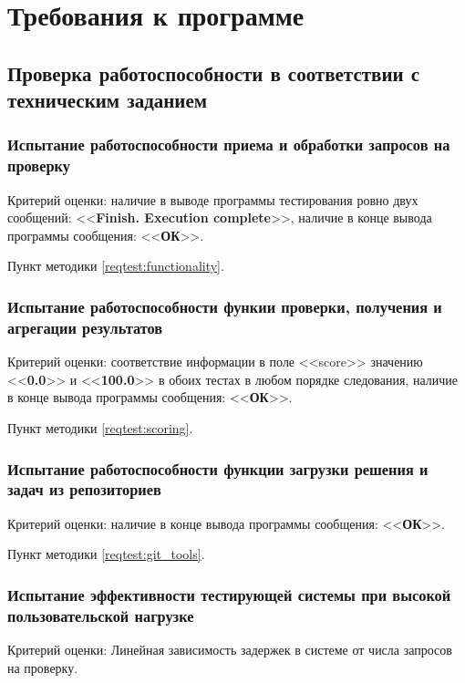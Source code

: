 \newpage
\section{Требования к программе}

\subsection{Проверка работоспособности \productname в соответствии с техническим заданием} \label{req:check-prog}

\subsubsection{Испытание работоспособности приема и обработки запросов на проверку} \label{req:functionality}
Критерий оценки: наличие в выводе программы тестирования ровно двух сообщений: <<\textbf{Finish. Execution complete}>>, наличие в конце вывода программы сообщения: <<\textbf{ОК}>>.

Пункт методики \ref{reqtest:functionality}.

\subsubsection{Испытание работоспособности функии проверки, получения и агрегации результатов} \label{req:scoring}
Критерий оценки: соответствие информации в поле <<score>> значению <<\textbf{0.0}>> и <<\textbf{100.0}>> в обоих тестах в любом порядке следования, наличие в конце вывода программы сообщения: <<\textbf{ОК}>>.

Пункт методики \ref{reqtest:scoring}.
  
\subsubsection{Испытание работоспособности функции загрузки решения и задач из репозиториев} \label{req:git_tools}
Критерий оценки: наличие в конце вывода программы сообщения: <<\textbf{ОК}>>.

Пункт методики \ref{reqtest:git_tools}.

\subsubsection{Испытание эффективности тестирующей системы при высокой пользовательской нагрузке} \label{req:load}
Критерий оценки: Линейная зависимость задержек в системе от числа запросов на проверку.

